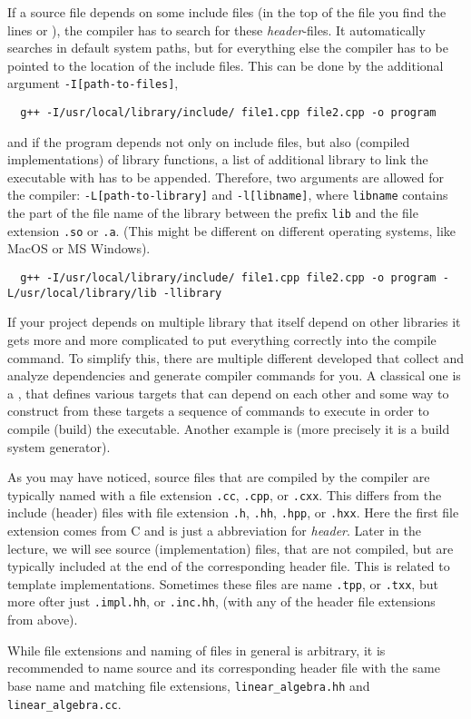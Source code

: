 If a source file depends on some include files (in the top of the file you find the lines  or ), the
compiler has to search for these \textit{header}-files. It automatically searches in default system paths, but for everything else the compiler
has to be pointed to the location of the include files. This can be done by the additional argument \texttt{-I[path-to-files]}, \eg
%
\begin{verbatim}
  g++ -I/usr/local/library/include/ file1.cpp file2.cpp -o program
\end{verbatim}
%
and if the program depends not only on include files, but also  (compiled implementations) of library functions, a list of additional
library to link the executable with has to be appended. Therefore, two arguments are allowed for the compiler: \texttt{-L[path-to-library]} and
\texttt{-l[libname]}, where \texttt{libname} contains the part of the file name of the library between the prefix \texttt{lib} and the file
extension \texttt{.so} or \texttt{.a}. (This might be different on different operating systems, like MacOS or MS Windows).
%
\begin{verbatim}
  g++ -I/usr/local/library/include/ file1.cpp file2.cpp -o program -L/usr/local/library/lib -llibrary
\end{verbatim}
%

If your project depends on multiple library that itself depend on other libraries it gets more and more complicated to put everything correctly
into the compile command. To simplify this, there are multiple different  developed that collect and analyze dependencies
and generate compiler commands for you. A classical one is a , that defines various targets that can depend on each other and
some way to construct from these targets a sequence of commands to execute in order to compile (build) the executable. Another example is
 (more precisely it is a build system generator).

\begin{rem}
As you may have noticed, source files that are compiled by the compiler are typically named with a file extension \texttt{.cc}, \texttt{.cpp},
or \texttt{.cxx}. This differs from the include (header) files with file extension \texttt{.h}, \texttt{.hh}, \texttt{.hpp}, or \texttt{.hxx}.
Here the first file extension comes from C and is just a abbreviation for \textit{header}. Later in the lecture, we will see source (implementation)
files, that are not compiled, but are typically included at the end of the corresponding header file. This is related to template
implementations. Sometimes these files are name \texttt{.tpp}, or \texttt{.txx}, but more ofter just \texttt{.impl.hh}, or \texttt{.inc.hh},
(with any of the header file extensions from above).

While file extensions and naming of files in general is arbitrary, it is recommended to name source and its corresponding header file with the
same base name and matching file extensions, \eg \texttt{linear\_algebra.hh} and \texttt{linear\_algebra.cc}.
\end{rem}


